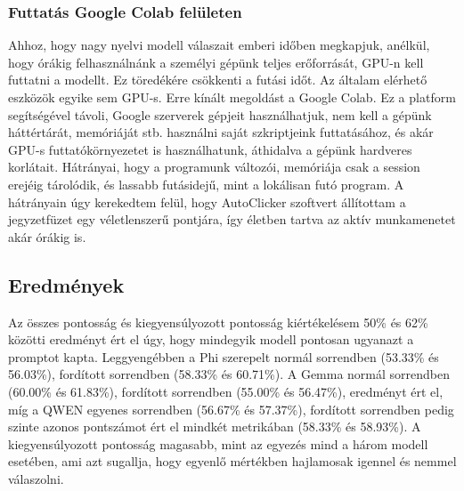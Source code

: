 \documentclass[12pt]{report}
\theoremstyle{definition}
\begin{document}
\subsubsection{Futtatás Google Colab felületen}
Ahhoz, hogy nagy nyelvi modell válaszait emberi időben megkapjuk, anélkül, hogy órákig felhasználnánk a személyi gépünk teljes erőforrását, GPU-n kell futtatni a modellt. Ez töredékére csökkenti a futási időt. Az általam elérhető eszközök egyike sem GPU-s. Erre kínált megoldást a Google Colab. Ez a platform segítségével távoli, Google szerverek gépjeit használhatjuk,  nem kell a gépünk háttértárát, memóriáját stb. használni saját szkriptjeink futtatásához, és akár GPU-s futtatókörnyezetet is használhatunk, áthidalva a gépünk hardveres korlátait. Hátrányai, hogy a programunk változói, memóriája csak a session erejéig tárolódik, és lassabb futásidejű, mint a lokálisan futó program. A hátrányain úgy kerekedtem felül, hogy AutoClicker szoftvert állítottam a jegyzetfüzet egy véletlenszerű pontjára, így életben tartva az aktív munkamenetet akár órákig is.




\subsection{Eredmények}

Az összes pontosság és kiegyensúlyozott pontosság kiértékelésem 50\% és 62\% közötti eredményt ért el úgy, hogy mindegyik modell pontosan ugyanazt a promptot kapta. Leggyengébben a Phi szerepelt normál sorrendben (53.33\% és 56.03\%), fordított sorrendben (58.33\% és 60.71\%). A Gemma normál sorrendben (60.00\% és 61.83\%), fordított sorrendben (55.00\% és 56.47\%), eredményt ért el, míg a QWEN egyenes sorrendben (56.67\% és 57.37\%), fordított sorrendben pedig szinte azonos pontszámot ért el mindkét metrikában (58.33\% és 58.93\%). A kiegyensúlyozott pontosság magasabb, mint az egyezés mind a három modell esetében, ami azt sugallja, hogy egyenlő mértékben hajlamosak igennel és nemmel válaszolni. %

\end{document}
